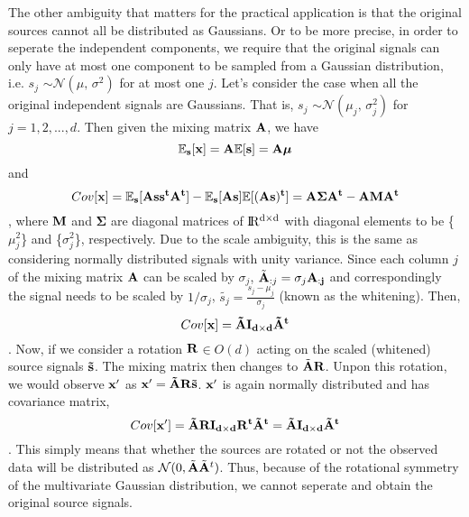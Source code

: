 \documentclass[aps,prl,preprint,superscriptaddress]{revtex4-2}
\begin{document}
The other ambiguity that matters for the practical application is that the original sources cannot all be distributed as Gaussians. Or to be more precise, in order to seperate the independent components, we require that the original signals can only have at most one component to be sampled from a Gaussian distribution, i.e. $s_{j}$ $\sim \mathcal{N}(\mu,\,\sigma^{2})$ for at most one $j$. Let's consider the case when all the original independent signals are Gaussians. That is, $s_{j}$ $\sim \mathcal{N}(\mu_{j},\,\sigma_{j}^{2})$ for $j = 1, 2, ..., d$. Then given the mixing matrix $\bf{A}$, we have 
\begin{equation}
\mathbb{E}_{\bf{s}}[\bf{x}] = \bf{A}\mathbb{E}[\bf{s}] = \bf{A}\bm{\mu}
\end{equation}
 and 
\begin{equation}
Cov[\bf{x}] = \mathbb{E}_{\bf{s}}[\bf{As}\bf{s}^t\bf{A}^{t}]-\mathbb{E}_{\bf{s}}[\bf{As}]\mathbb{E}[(\bf{As})^{t}] =  \bf{A}\bm{\Sigma}\bf{A}^{t}-\bf{A}\bf{M}\bf{A}^{t}
\end{equation} 
, where $\bf{M}$ and $\bm{\Sigma}$ are diagonal matrices of $\rm I\!R^{d\times d}$ with diagonal elements to be \{$\mu_{j}^{2}$\} and \{$\sigma_{j}^{2}$\}, respectively. Due to the scale ambiguity, this is the same as considering normally distributed signals with unity variance. Since each column $j$ of the mixing matrix $\bf{A}$ can be scaled by $\sigma_{j}$, $\tilde{\bf{A}}_{:j} = \sigma_{j}\bf{A}_{:j}$ and correspondingly the signal needs to be scaled by $1/\sigma_{j}$, $\tilde{s_{j}} = \frac{s_{j}-\mu_{j}}{\sigma_{j}}$ (known as the whitening). Then, 
\begin{equation}
Cov[\bf{x}] = \tilde{\bf{A}}\bf{I}_{d\times d}\tilde{\bf{A}}^{t}
\end{equation}.
Now, if we consider a rotation $\bf{R} $$\in O(d)$ acting on the scaled (whitened) source signals $\bf{\tilde{s}}$. The mixing matrix then changes to $\tilde{\bf{A}}\bf{R}$. Unpon this rotation, we would observe $\bf{x'}$ as $\bf{x'} = \tilde{\bf{A}}\bf{R}\tilde{\bf{s}}$. $\bf{x'}$ is again normally distributed and has covariance matrix,
\begin{equation}
Cov[\bf{x'}] = \tilde{\bf{A}}\bf{R}\bf{I}_{d\times d}\bf{R}^{t}\tilde{\bf{A}}^{t} = \tilde{\bf{A}}\bf{I}_{d\times d}\tilde{\bf{A}}^{t} 
\end{equation}. This simply means that whether the sources are rotated or not the observed data will be distributed as $\mathcal{N}(0, \tilde{\bf{A}}\tilde{\bf{A}}^{t})$. Thus, because of the rotational symmetry of the multivariate Gaussian distribution, we cannot seperate and obtain the original source signals.
\end{document}
